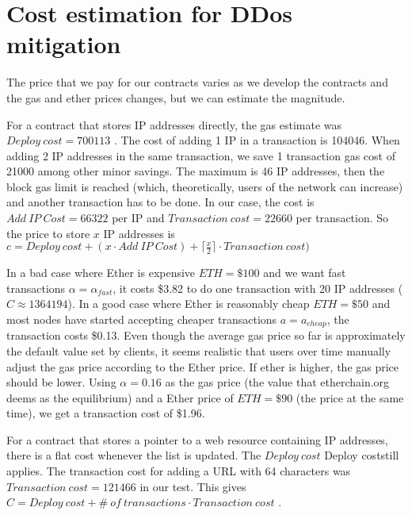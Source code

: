 \section{Cost estimation for DDos mitigation}

The price that we pay for our contracts varies as we develop the contracts and the gas and ether prices changes, but we can estimate the magnitude.

For a contract that stores IP addresses directly, the gas estimate was $ Deploy\ cost = 700113$ . The cost of adding 1 IP in a transaction is 104046. When adding 2 IP addresses in the same transaction, we save 1 transaction gas cost of 21000 among other minor savings.  The maximum is 46 IP addresses, then the block gas limit is reached (which, theoretically, users of the network can increase) and another transaction has to be done. In our case, the cost is $ Add \ IP\ Cost = 66322 $ per IP and $ Transaction\ cost = 22660 $ per transaction. So the price to store $ x $ IP addresses is $ c = Deploy\ cost + (x \cdot Add\ IP\ Cost) + \lceil\frac{x}{2}\rceil \cdot Transaction\ cost) $

In a bad case where Ether is expensive $ ETH = \$100 $ and we want fast transactions $ \alpha = \alpha_{fast} $, it costs \$3.82 to do one transaction with 20 IP addresses ($ C \approx 1364194 $). In a good case where Ether is reasonably cheap $ ETH = \$50 $ and most nodes have started accepting cheaper transactions $ a = a_{cheap} $, the transaction costs \$0.13. Even though the average gas price so far is approximately the default value set by clients, it seems realistic that users over time manually adjust the gas price according to the Ether price. If ether is higher, the gas price should be lower. Using $ \alpha = 0.16 $ as the gas price (the value that etherchain.org deems as the equilibrium) and a Ether price of $ ETH = \$90 $ (the price at the same time), we get a transaction cost of \$1.96.

For a contract that stores a pointer to a web resource containing IP addresses, there is a flat cost whenever the list is updated. The $Deploy\ cost$ Deploy coststill applies. The transaction cost for adding a URL with 64 characters was $ Transaction\ cost = 121466 $ in our test. This gives $ C = Deploy\ cost + \#\ of\ transactions \cdot Transaction\ cost$ .
